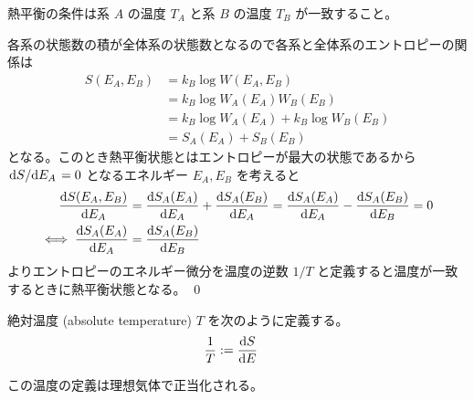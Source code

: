 \documentclass[uplatex,dvipdfmx,a4paper,11pt]{jlreq}
\makeatletter
\theoremstyle{definition}
\renewenvironment{proof}[1][\proofname]{\par
  \normalfont
  \topsep6\p@\@plus6\p@ \trivlist
  \item[\hskip\labelsep{\bfseries #1}\@addpunct{\bfseries}]\ignorespaces\quad\par
}{%
  \qed\endtrivlist\@endpefalse
}
\renewcommand\proofname{証明}
\makeatother
\begin{document}
\begin{theorem}
  熱平衡の条件は系 $A$ の温度 $T_A$ と系 $B$ の温度 $T_B$ が一致すること。
\end{theorem}
\begin{proof}
  各系の状態数の積が全体系の状態数となるので各系と全体系のエントロピーの関係は
  \begin{align}
    S(E_A, E_B) & = k_B\log W(E_A, E_B)                 \\
                & = k_B\log W_A(E_A)W_B(E_B)            \\
                & = k_B\log W_A(E_A) + k_B\log W_B(E_B) \\
                & = S_A(E_A) + S_B(E_B)
  \end{align}
  となる。このとき熱平衡状態とはエントロピーが最大の状態であるから $\dv*{S}{E_A} = 0$ となるエネルギー $E_A, E_B$ を考えると
  \begin{align}
    \dv{S(E_A, E_B)}{E_A}   & = \dv{S_A(E_A)}{E_A} + \dv{S_A(E_B)}{E_A} = \dv{S_A(E_A)}{E_A} - \dv{S_A(E_B)}{E_B} = 0 \\
    \iff \dv{S_A(E_A)}{E_A} & = \dv{S_A(E_B)}{E_B}
  \end{align}
  よりエントロピーのエネルギー微分を温度の逆数 $1/T$ と定義すると温度が一致するときに熱平衡状態となる。
\end{proof}

\begin{definition}
  絶対温度 (absolute temperature) $T$ を次のように定義する。
  \begin{align}
    \frac{1}{T} & := \dv{S}{E}
  \end{align}
\end{definition}

この温度の定義は理想気体で正当化される。
\end{document}
